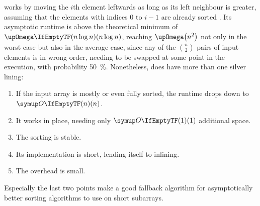 \section{\texorpdfstring{\IS{}}{InsertionSort}}
\label{sec:tasklet:insertion}

\IS{} works by moving the \(i\)th element leftwards as long as its left neighbour is greater, assuming that the elements with indices \(0\) to \(i - 1\) are already sorted \cites[83]{maurer1974datenstrukturen}[Section~2.2.1]{wirth1975algorithmen}.
Its asymptotic runtime is above the theoretical minimum of \(\bigomega{n \log n}\), reaching \(\bigomega*{n^2}\) not only in the worst case but also in the average case, since any of the \(\binom{n}{2}\) pairs of input elements is in wrong order, needing to be swapped at some point in the execution, with probability \qty{50}{\percent}.
Nonetheless, \IS{} does have more than one silver lining:
\begin{enumerate}
	\item
	If the input array is mostly or even fully sorted, the runtime drops down to \(\bigoh{n}\).

	\item
	It works in place, needing only \(\bigoh{1}\) additional space.

	\item
	The sorting is stable.

	\item
	Its implementation is short, lending itself to inlining.

	\item
	The overhead is small.
\end{enumerate}
Especially the last two points make \IS{} a good fallback algorithm for asymptotically better sorting algorithms to use on short subarrays.






